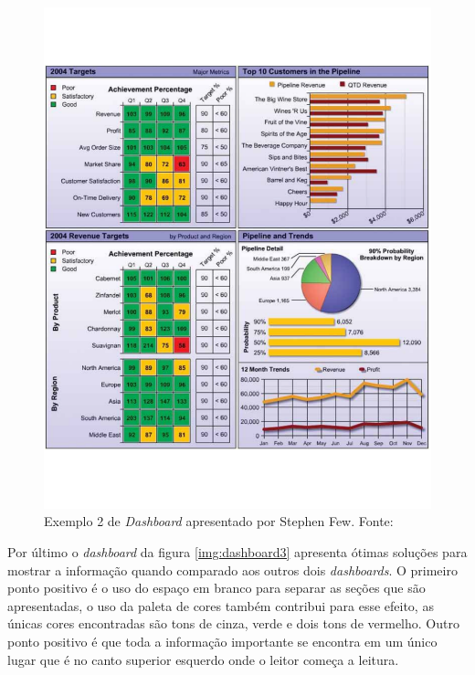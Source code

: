 \begin{figure}[]
\centering
\includegraphics[scale=0.50]{dashboard2}
\caption{Exemplo 2 de \textit{Dashboard} apresentado por Stephen Few. Fonte: \cite{book_design}}
\label{img:dashboard2}
\end{figure}
Por último o \textit{dashboard} da figura \ref{img:dashboard3} apresenta ótimas soluções para mostrar a informação quando comparado aos outros dois \textit{dashboards}. O primeiro ponto positivo é o uso do espaço em branco para separar as seções que são apresentadas, o uso da paleta de cores também contribui para esse efeito, as únicas cores encontradas são tons de cinza, verde e dois tons de vermelho. Outro ponto positivo é que toda a informação importante se encontra em um único lugar que é no canto superior esquerdo onde o leitor começa a leitura.
\graphicspath{{figuras/}}
